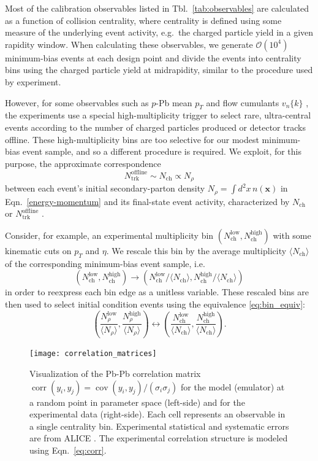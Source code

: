 \documentclass[aps,prc,reprint,amsmath,nofootinbib]{revtex4-1}
\newcommand{\nch}{N_\text{ch}}
\newcommand{\ntrk}{N_\text{trk}^\text{offline}}
\newcommand{\vnk}[2]{v_#1\{#2\}}
\newcommand{\x}{\mathbf x}
\newcommand{\order}[1]{$\mathcal O(10^{#1})$}
\DeclareMathOperator{\cov}{cov}
\DeclareMathOperator{\corr}{corr}
\begin{document}
Most of the calibration observables listed in Tbl.~\ref{tab:observables} are calculated as a function of collision centrality, where centrality is defined using some measure of the underlying event activity, e.g.\ the charged particle yield in a given rapidity window.
When calculating these observables, we generate \order{4} minimum-bias events at each design point and divide the events into centrality bins using the charged particle yield at midrapidity, similar to the procedure used by experiment.

However, for some observables such as $p$-Pb mean $p_T$ \cite{Abelev:2013bla} and flow cumulants $\vnk{n}{k}$ \cite{Chatrchyan:2013nka}, the experiments use a special high-multiplicity trigger to select rare, ultra-central events according to the number of charged particles produced or detector tracks offline.
These high-multiplicity bins are too selective for our modest minimum-bias event sample, and so a different procedure is required.
We exploit, for this purpose, the approximate correspondence
\begin{equation}
  \label{eq:bin_equiv}
  \ntrk \sim \nch \propto N_\rho
\end{equation}
between each event's initial secondary-parton density ${N_\rho = \int d^2x\,n(\x)}$ in Eqn.~\eqref{energy-momentum} and its final-state event activity, characterized by $\nch$ or $\ntrk$ \cite{Abelev:2013bla, Chatrchyan:2013nka}.

Consider, for example, an experimental multiplicity bin $(\nch^\text{low}, \nch^\text{high})$ with some kinematic cuts on $p_T$ and $\eta$.
We rescale this bin by the average multiplicity $\langle \nch \rangle$ of the corresponding minimum-bias event sample, i.e.\
\begin{equation}
  (\nch^\text{low}, \nch^\text{high}) \rightarrow (\nch^\text{low} / \langle \nch \rangle, \nch^\text{high} / \langle \nch \rangle)
\end{equation}
in order to reexpress each bin edge as a unitless variable.
These rescaled bins are then used to select initial condition events using the equivalence \eqref{eq:bin_equiv}:
\begin{equation}
  \label{eq:mult_trigger}
  \left (\frac{N^\text{low}_\rho}{\langle N_\rho \rangle}, \frac{N^\text{high}_\rho}{\langle N_\rho \rangle} \right) \leftrightarrow \left (\frac{\nch^\text{low}}{\langle \nch \rangle}, \frac{\nch^\text{high}}{\langle \nch \rangle} \right ).
\end{equation}

\begin{figure}[t]
  \texttt{[image: correlation\_matrices]}
  \caption{
    \label{fig:correlation}
    Visualization of the Pb-Pb correlation matrix $\corr(y_i, y_j) = \cov(y_i,y_j)/(\sigma_i \sigma_j)$ for the model (emulator) at a random point in parameter space (left-side) and for the experimental data (right-side).
    Each cell represents an observable in a single centrality bin. Experimental statistical and systematic errors are from ALICE \cite{Adam:2015ptt, Adam:2016izf}.
    The experimental correlation structure is modeled using Eqn.~\eqref{eq:corr}.
  }
\end{figure}
\end{document}
